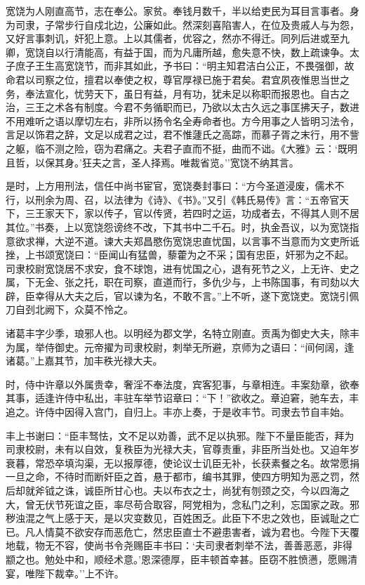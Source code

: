 \documentclass[]{article}
\begin{document}
宽饶为人刚直高节，志在奉公。家贫。奉钱月数千，半以给吏民为耳目言事者。身为司隶，子常步行自戍北边，公廉如此。然深刻喜陷害人，在位及贵戚人与为怨，又好言事刺讥，奸犯上意。上以其儒者，优容之，然亦不得迁。同列后进或至九卿，宽饶自以行清能高，有益于国，而为凡庸所越，愈失意不快，数上疏谏争。太子庶子王生高宽饶节，而非其如此，予书曰：``明主知君洁白公正，不畏强御，故命君以司察之位，擅君以奉使之权，尊官厚禄已施于君矣。君宜夙夜惟思当世之务，奉法宣化，忧劳天下，虽日有益，月有功，犹未足以称职而报恩也。自古之治，三王之术各有制度。今君不务循职而已，乃欲以太古久远之事匡拂天子，数进不用难听之语以摩切左右，非所以扬令名全寿命者也。方今用事之人皆明习法令，言足以饰君之辞，文足以成君之过，君不惟蘧氏之高踪，而慕子胥之末行，用不訾之躯，临不测之险，窃为君痛之。夫君子直而不挺，曲而不诎。《大雅》云：`既明且哲，以保其身。'狂夫之言，圣人择焉。唯裁省览。''宽饶不纳其言。

是时，上方用刑法，信任中尚书宦官，宽饶奏封事曰：``方今圣道浸废，儒术不行，以刑余为周、召，以法律为《诗》、《书》。''又引《韩氏易传》言：``五帝官天下，三王家天下，家以传子，官以传贤，若四时之运，功成者去，不得其人则不居其位。''书奏，上以宽饶怨谤终不改，下其书中二千石。时，执金吾议，以为宽饶指意欲求禅，大逆不道。谏大夫郑昌愍伤宽饶忠直忧国，以言事不当意而为文吏所诋挫，上书颂宽饶曰：``臣闻山有猛兽，藜藿为之不采；国有忠臣，奸邪为之不起。司隶校尉宽饶居不求安，食不球饱，进有忧国之心，退有死节之义，上无许、史之属，下无金、张之托，职在司察，直道而行，多仇少与，上书陈国事，有司劾以大辟，臣幸得从大夫之后，官以谏为名，不敢不言。''上不听，遂下宽饶吏。宽饶引佩刀自刭北阙下，众莫不怜之。

诸葛丰字少季，琅邪人也。以明经为郡文学，名特立刚直。贡禹为御史大夫，除丰为属，举侍御史。元帝擢为司隶校尉，刺举无所避，京师为之语曰：``间何阔，逢诸葛。''上嘉其节，加丰秩光禄大夫。

时，侍中许章以外属贵幸，奢淫不奉法度，宾客犯事，与章相连。丰案劾章，欲奉其事，适逢许侍中私出，丰驻车举节诏章曰：``下！''欲收之。章迫窘，驰车去，丰追之。许侍中因得入宫门，自归上。丰亦上奏，于是收丰节。司隶去节自丰始。

丰上书谢曰：``臣丰驽怯，文不足以劝善，武不足以执邪。陛下不量臣能否，拜为司隶校尉，未有以自效，复秩臣为光禄大夫，官尊责重，非臣所当处也。又迫年岁衰暮，常恐卒填沟渠，无以报厚德，使论议士讥臣无补，长获素餐之名。故常愿捐一旦之命，不待时而断奸臣之首，悬于都市，编书其罪，使四方明知为恶之罚，然后却就斧钺之诛，诚臣所甘心也。夫以布衣之士，尚犹有刎颈之交，今以四海之大，曾无伏节死谊之臣，率尽苟合取容，阿党相为，念私门之利，忘国家之政。邪秽浊混之气上感于天，是以灾变数见，百姓困乏。此臣下不忠之效也，臣诚耻之亡已。凡人情莫不欲安存而恶危亡，然忠臣直士不避患害者，诚为君也。今陛下天覆地载，物无不容，使尚书令尧赐臣丰书曰：`夫司隶者刺举不法，善善恶恶，非得颛之也。勉处中和，顺经术意。'恩深德厚，臣丰顿首幸甚。臣窃不胜愤懑，愿赐清宴，唯陛下裁幸。''上不许。
\end{document}
